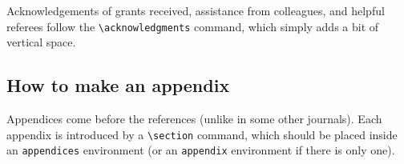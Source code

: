 \documentclass[debug]{rmxaa}
\newcommand{\CS}[1]{\texttt{\textbackslash #1}}
\begin{document}
\acknowledgments Acknowledgements of grants received, assistance from
colleagues, and helpful referees follow the \CS{acknowledgments}
command, which simply adds a bit of vertical space.

\begin{appendix}
  \section{How to make an appendix}
  Appendices come before the references (unlike in some other
  journals). Each appendix is introduced by a \CS{section} command,
  which should be placed inside an \texttt{appendices} environment (or
  an \texttt{appendix} environment if there is only one).
\end{appendix}



\end{document}
